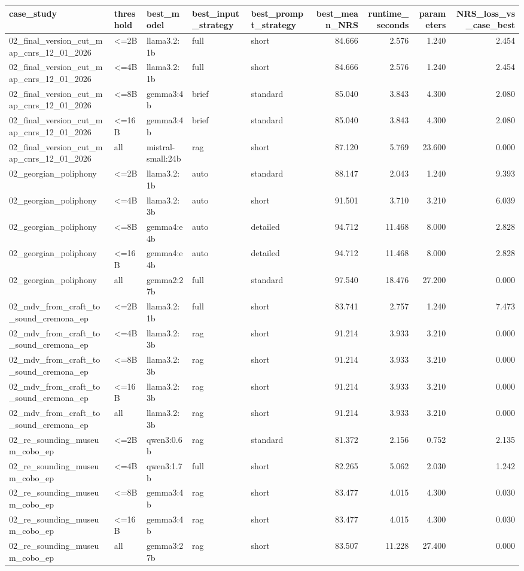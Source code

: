 \documentclass{article}
\begin{document}
\begin{tabular}{lllllrrrr}
\toprule
case\_study & threshold & best\_model & best\_input\_strategy & best\_prompt\_strategy & best\_mean\_NRS & runtime\_seconds & parameters & NRS\_loss\_vs\_case\_best \\
\midrule
02\_final\_version\_cut\_map\_cnrs\_12\_01\_2026 & <=2B & llama3.2:1b & full & short & 84.666 & 2.576 & 1.240 & 2.454 \\
02\_final\_version\_cut\_map\_cnrs\_12\_01\_2026 & <=4B & llama3.2:1b & full & short & 84.666 & 2.576 & 1.240 & 2.454 \\
02\_final\_version\_cut\_map\_cnrs\_12\_01\_2026 & <=8B & gemma3:4b & brief & standard & 85.040 & 3.843 & 4.300 & 2.080 \\
02\_final\_version\_cut\_map\_cnrs\_12\_01\_2026 & <=16B & gemma3:4b & brief & standard & 85.040 & 3.843 & 4.300 & 2.080 \\
02\_final\_version\_cut\_map\_cnrs\_12\_01\_2026 & all & mistral-small:24b & rag & short & 87.120 & 5.769 & 23.600 & 0.000 \\
02\_georgian\_poliphony & <=2B & llama3.2:1b & auto & standard & 88.147 & 2.043 & 1.240 & 9.393 \\
02\_georgian\_poliphony & <=4B & llama3.2:3b & auto & short & 91.501 & 3.710 & 3.210 & 6.039 \\
02\_georgian\_poliphony & <=8B & gemma4:e4b & auto & detailed & 94.712 & 11.468 & 8.000 & 2.828 \\
02\_georgian\_poliphony & <=16B & gemma4:e4b & auto & detailed & 94.712 & 11.468 & 8.000 & 2.828 \\
02\_georgian\_poliphony & all & gemma2:27b & full & standard & 97.540 & 18.476 & 27.200 & 0.000 \\
02\_mdv\_from\_craft\_to\_sound\_cremona\_ep & <=2B & llama3.2:1b & full & short & 83.741 & 2.757 & 1.240 & 7.473 \\
02\_mdv\_from\_craft\_to\_sound\_cremona\_ep & <=4B & llama3.2:3b & rag & short & 91.214 & 3.933 & 3.210 & 0.000 \\
02\_mdv\_from\_craft\_to\_sound\_cremona\_ep & <=8B & llama3.2:3b & rag & short & 91.214 & 3.933 & 3.210 & 0.000 \\
02\_mdv\_from\_craft\_to\_sound\_cremona\_ep & <=16B & llama3.2:3b & rag & short & 91.214 & 3.933 & 3.210 & 0.000 \\
02\_mdv\_from\_craft\_to\_sound\_cremona\_ep & all & llama3.2:3b & rag & short & 91.214 & 3.933 & 3.210 & 0.000 \\
02\_re\_sounding\_museum\_cobo\_ep & <=2B & qwen3:0.6b & rag & standard & 81.372 & 2.156 & 0.752 & 2.135 \\
02\_re\_sounding\_museum\_cobo\_ep & <=4B & qwen3:1.7b & full & short & 82.265 & 5.062 & 2.030 & 1.242 \\
02\_re\_sounding\_museum\_cobo\_ep & <=8B & gemma3:4b & rag & short & 83.477 & 4.015 & 4.300 & 0.030 \\
02\_re\_sounding\_museum\_cobo\_ep & <=16B & gemma3:4b & rag & short & 83.477 & 4.015 & 4.300 & 0.030 \\
02\_re\_sounding\_museum\_cobo\_ep & all & gemma3:27b & rag & short & 83.507 & 11.228 & 27.400 & 0.000 \\
\bottomrule
\end{tabular}
\end{document}
